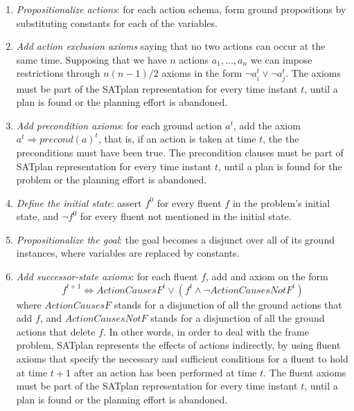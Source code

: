 \documentclass{article}
\begin{document}
\begin{enumerate}
    \item \textit{Propositionalize actions}: for each action schema, form ground propositions by substituting constants for each of the variables.
    
    \item \textit{Add action exclusion axioms} saying that no two actions can occur at the same time. Supposing that we have $n$ actions $a_1, ..., a_n$ we can impose restrictions through $n(n-1)/2$ axioms in the form $\neg a_i^t \lor \neg a_j^t$. The axioms must be part of the SATplan representation for every time instant $t$, until a plan is found or the planning effort is abandoned. 
    
    \item \textit{Add precondition axioms}: for each ground action $a^t$, add the axiom $a^t\Rightarrow precond(a)^t$, that is, if an action is taken at time $t$, the the preconditions must have been true. The precondition clauses must be part of SATplan representation for every time instant $t$, until a plan is found for the problem or the planning effort is abandoned.
    
    \item \textit{Define the initial state}: assert $f^0$ for every fluent $f$ in the problem's initial state, and $\neg f^0$ for every fluent not mentioned in the initial state.
    
    \item \textit{Propositionalize the goal}: the goal becomes a disjunct over all of its ground instances, where variables are replaced by constants.
    
    \item \textit{Add successor-state axioms}: for each fluent $f$, add and axiom on the form 
    $$f^{t+1} \Leftrightarrow ActionCausesF^t \lor (f^t\land \neg ActionCausesNotF^t)$$
    where $ActionCausesF$ stands for a disjunction of all the ground actions that add $f$, and $ActionCausesNotF$ stands for a disjunction of all the ground actions that delete $f$. In other words, in order to deal with the frame problem, SATplan represents the effects of actions indirectly, by using fluent axioms that specify the necessary and sufficient conditions for a fluent to hold at time $t+1$ after an action has been performed at time $t$. The fluent axioms must be part of the SATplan representation for every time instant $t$, until a plan is found or the planning effort is abandoned.
\end{enumerate}
\end{document}

